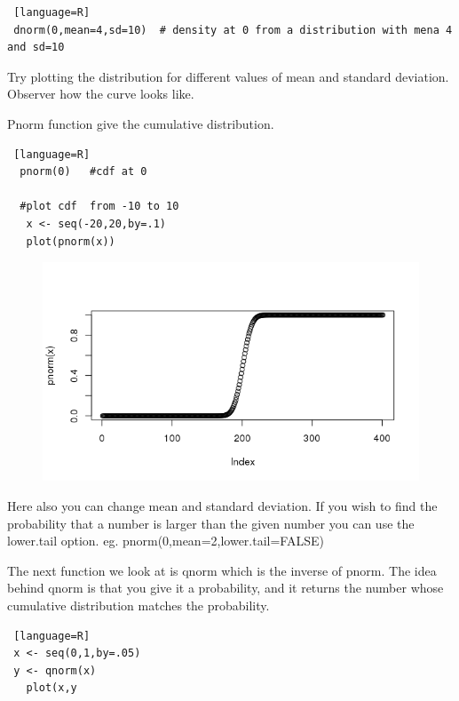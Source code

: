 \documentclass["../Applied_probabillity _and_statistics_lab_KTU.tex"]{subfiles}
\begin{document}
 \begin{lstlisting} [language=R]
 dnorm(0,mean=4,sd=10)  # density at 0 from a distribution with mena 4 and sd=10
 \end{lstlisting}

Try plotting the distribution for different values of mean and standard deviation. Observer how the curve looks like.

Pnorm function give the cumulative   distribution. 
 \begin{lstlisting} [language=R]
  pnorm(0)   #cdf at 0
  
  #plot cdf  from -10 to 10 
   x <- seq(-20,20,by=.1)
   plot(pnorm(x))

 \end{lstlisting}

\begin{figure}
 \includegraphics[scale=.4]{images/normal_cdf.png}
 \label{norm}
 \end{figure} 
Here also you can change mean and standard deviation. If you wish to find the probability that a number is larger than the given number you can use the lower.tail option. eg.  pnorm(0,mean=2,lower.tail=FALSE)

The next function we look at is qnorm which is the inverse of pnorm. The idea behind qnorm is that you give it a probability, and it returns the number whose cumulative distribution matches the probability. 

\begin{lstlisting} [language=R]
 x <- seq(0,1,by=.05)
 y <- qnorm(x)
   plot(x,y
\end{lstlisting}
\end{document}
